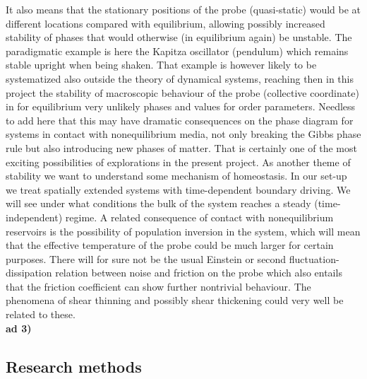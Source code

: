 It also means that the stationary positions of the probe (quasi-static) would be at different locations compared with equilibrium, allowing possibly increased stability of phases that would otherwise (in equilibrium again) be unstable.  The paradigmatic example is here the Kapitza oscillator (pendulum) which remains stable upright when being shaken.  That example is however likely to be systematized also outside the theory of dynamical systems, reaching then in this project the stability of macroscopic behaviour of the probe (collective coordinate) in for equilibrium very unlikely phases and values for order parameters.  Needless to  add here that this may have dramatic consequences on the phase diagram for systems in contact with nonequilibrium media, not only breaking the Gibbs phase rule but also introducing new phases of matter.  That is certainly one of the most exciting possibilities of explorations in the present project. As another theme of stability we want to understand some mechanism of homeostasis. In our set-up we treat spatially extended systems with time-dependent boundary driving. We will see under what conditions the bulk of the system reaches a steady (time-independent) regime. A related consequence of contact with nonequilibrium reservoirs is the possibility of population inversion in the system, which will mean that the effective temperature of the probe could be much larger for certain purposes.  There will for sure not be the usual Einstein or second fluctuation-dissipation relation between noise and friction on the probe which also entails that the friction coefficient can show further nontrivial behaviour.  The phenomena of shear thinning and possibly shear thickening could very well be related to these.\\
{\bf ad 3)} 



\subsection{Research methods}\label{sec:methods}

